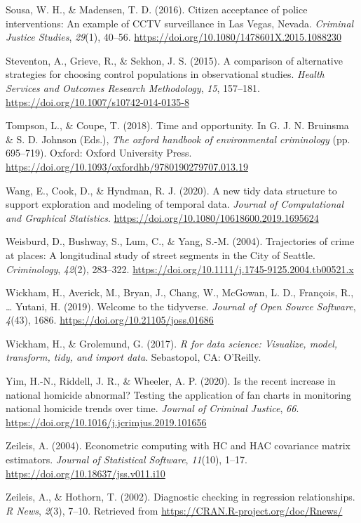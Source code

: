 \documentclass[
  english,
  man,a4paper,mask,floatsintext]{apa6}
\begin{document}
\leavevmode\hypertarget{ref-Sousa:2016aa}{}%
Sousa, W. H., \& Madensen, T. D. (2016). Citizen acceptance of police interventions: An example of CCTV surveillance in Las Vegas, Nevada. \emph{Criminal Justice Studies}, \emph{29}(1), 40--56. \url{https://doi.org/10.1080/1478601X.2015.1088230}

\leavevmode\hypertarget{ref-Steventon:2015aa}{}%
Steventon, A., Grieve, R., \& Sekhon, J. S. (2015). A comparison of alternative strategies for choosing control populations in observational studies. \emph{Health Services and Outcomes Research Methodology}, \emph{15}, 157--181. \url{https://doi.org/10.1007/s10742-014-0135-8}

\leavevmode\hypertarget{ref-Tompson:2018aa}{}%
Tompson, L., \& Coupe, T. (2018). Time and opportunity. In G. J. N. Bruinsma \& S. D. Johnson (Eds.), \emph{The oxford handbook of environmental criminology} (pp. 695--719). Oxford: Oxford University Press. \url{https://doi.org/10.1093/oxfordhb/9780190279707.013.19}

\leavevmode\hypertarget{ref-Wang:2020aa}{}%
Wang, E., Cook, D., \& Hyndman, R. J. (2020). A new tidy data structure to support exploration and modeling of temporal data. \emph{Journal of Computational and Graphical Statistics}. \url{https://doi.org/10.1080/10618600.2019.1695624}

\leavevmode\hypertarget{ref-Weisburd:2004aa}{}%
Weisburd, D., Bushway, S., Lum, C., \& Yang, S.-M. (2004). Trajectories of crime at places: A longitudinal study of street segments in the City of Seattle. \emph{Criminology}, \emph{42}(2), 283--322. \url{https://doi.org/10.1111/j.1745-9125.2004.tb00521.x}

\leavevmode\hypertarget{ref-Wickham:2019aa}{}%
Wickham, H., Averick, M., Bryan, J., Chang, W., McGowan, L. D., François, R., \ldots{} Yutani, H. (2019). Welcome to the tidyverse. \emph{Journal of Open Source Software}, \emph{4}(43), 1686. \url{https://doi.org/10.21105/joss.01686}

\leavevmode\hypertarget{ref-Wickham:2017ab}{}%
Wickham, H., \& Grolemund, G. (2017). \emph{R for data science: Visualize, model, transform, tidy, and import data}. Sebastopol, CA: O'Reilly.

\leavevmode\hypertarget{ref-Yim:2020aa}{}%
Yim, H.-N., Riddell, J. R., \& Wheeler, A. P. (2020). Is the recent increase in national homicide abnormal? Testing the application of fan charts in monitoring national homicide trends over time. \emph{Journal of Criminal Justice}, \emph{66}. \url{https://doi.org/10.1016/j.jcrimjus.2019.101656}

\leavevmode\hypertarget{ref-Zeileis:2004aa}{}%
Zeileis, A. (2004). Econometric computing with HC and HAC covariance matrix estimators. \emph{Journal of Statistical Software}, \emph{11}(10), 1--17. \url{https://doi.org/10.18637/jss.v011.i10}

\leavevmode\hypertarget{ref-Zeileis:2002aa}{}%
Zeileis, A., \& Hothorn, T. (2002). Diagnostic checking in regression relationships. \emph{R News}, \emph{2}(3), 7--10. Retrieved from \url{https://CRAN.R-project.org/doc/Rnews/}
\end{document}
